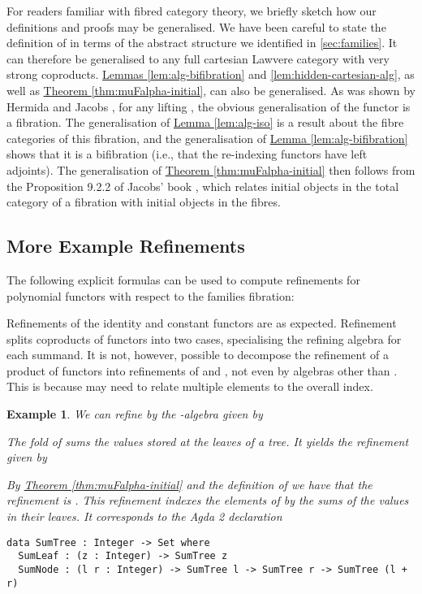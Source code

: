 \documentclass{LMCS}
\newtheorem{eorollary}{Example}
\newcommand{\lemref}[1]{\hyperref[#1]{Lemma \ref*{#1}}}
\newcommand{\thmref}[1]{\hyperref[#1]{Theorem \ref*{#1}}}
\begin{document}
For readers familiar with fibred category theory, we briefly sketch
how our definitions and proofs may be generalised. We have been
careful to state the definition of  in terms of the abstract
structure we identified in \autoref{sec:families}. It can therefore be
generalised to any full cartesian Lawvere category with very strong
coproducts.  \hyperref[lem:alg-bifibration]{Lemmas
  \ref*{lem:alg-bifibration}} and \hyperref[lem:hidden-cartesian-alg]{
  \ref*{lem:hidden-cartesian-alg}}, as well as
\thmref{thm:muFalpha-initial}, can also be generalised. As was shown
by Hermida and Jacobs \cite{hermida98structural}, for any lifting
, the obvious generalisation of the functor  is a fibration. The generalisation of
\lemref{lem:alg-iso} is a result about the fibre categories of this
fibration, and the generalisation of \lemref{lem:alg-bifibration}
shows that it is a bifibration (i.e., that the re-indexing functors
have left adjoints). The generalisation of
\thmref{thm:muFalpha-initial} then follows from the Proposition 9.2.2
of Jacobs' book \cite{jacobs99book}, which relates initial objects in
the total category of a fibration with initial objects in the fibres.

\subsection{More Example Refinements}\label{sec:refining-examples}

The following explicit formulas can be used to compute refinements for
polynomial functors with respect to the families fibration:

Refinements of the identity and constant functors are as expected.
Refinement splits coproducts of functors into two cases, 
specialising the refining algebra for each summand. It is not, however,
possible to decompose the refinement of a product of functors  into refinements of  and , not even by algebras other
than . This is because  may need to relate multiple 
elements to the overall index. 

\begin{eorollary}\label{ex:refined-trees}
  We can refine  by the
  -algebra  given by

The fold of  sums the values stored at the leaves of
a tree. It yields the refinement  given by

By \thmref{thm:muFalpha-initial} and the definition of
 we have that the refinement  is . This
refinement indexes the elements of  by the sums
of the values in their leaves. It corresponds to the Agda 2 declaration
\begin{verbatim}
data SumTree : Integer -> Set where
  SumLeaf : (z : Integer) -> SumTree z
  SumNode : (l r : Integer) -> SumTree l -> SumTree r -> SumTree (l + r)
\end{verbatim}
\end{eorollary}
\end{document}
